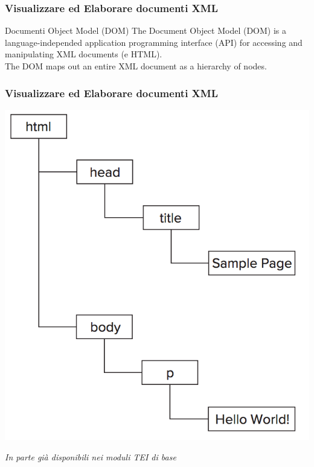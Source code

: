 \begin{frame}
    \frametitle{Visualizzare ed Elaborare documenti XML}
    \addtocounter{nframe}{1}
    

     \begin{block}{Documenti Object Model (DOM)}
        The Document Object Model (DOM) is a language-independed application programming interface (API) for accessing and manipulating XML documents (e HTML).
        \\ The DOM maps out an entire XML document as a hierarchy of nodes.

     \end{block}

\end{frame}


\begin{frame}
    \frametitle{Visualizzare ed Elaborare documenti XML}
    \addtocounter{nframe}{1}
    
    \begin{center}
        \includegraphics[width=.7\textwidth]{imgs/XML-DOM.png}
    \end{center}
    \textit{In parte già disponibili nei moduli TEI di base}

\end{frame}

